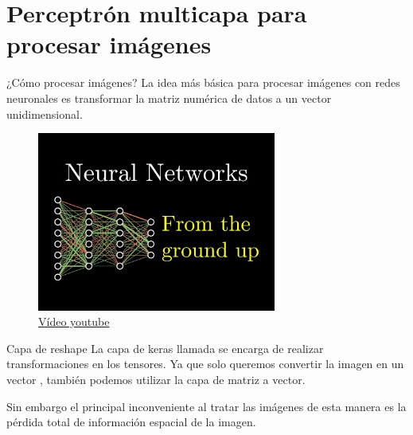 \section{Perceptrón multicapa para procesar imágenes}

\begin{frame}{¿Cómo procesar imágenes?}
La idea más \alert{básica} para procesar imágenes con redes neuronales es  transformar la \alert{matriz numérica} de datos a un \alert{vector unidimensional}.

\begin{figure}
    \centering
    \includegraphics[width=0.7\textwidth]{Slides/figures/Tema 3/NNVideo.jpg}
    \caption{\href{https://www.youtube.com/watch?v=aircAruvnKk&t=218s}{Vídeo youtube}}
\end{figure}
\end{frame}

\begin{frame}{Capa de reshape}
La capa de \alert{keras} llamada  se encarga de realizar transformaciones en los tensores. Ya que solo queremos convertir la imagen en un vector , también podemos utilizar la capa  de \alert{matriz} a \alert{vector}.

Sin embargo el principal \alert{inconveniente} al tratar las imágenes de esta manera es la \alert{pérdida total} de información espacial de la imagen.
\end{frame}


